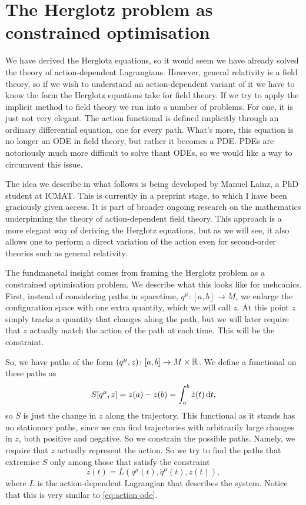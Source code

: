 \documentclass[../main.tex]{subfiles}
\begin{document}
\section{The Herglotz problem as constrained optimisation}
We have derived the Herglotz equations, so it would seem we have already solved the theory
of action-dependent Lagrangians. However, general relativity is a field theory, so if we
wish to understand an action-dependent variant of it we have to know the form the Herglotz
equations take for field theory. If we try to apply the implicit method to field theory we
run into a number of problems. For one, it is just not very elegant. The action functional
is defined implicitly through an ordinary differential equation, one for every path.
What's more, this equation is no longer an ODE in field theory, but rather it becomes a
PDE. PDEs are notoriously much more difficult to solve thant ODEs, so we would like a way
to circumvent this issue. 

The idea we describe in what follows is being developed by Manuel Lainz, a PhD student at
ICMAT. This is currently in a preprint stage, to which I have been graciously given
access.  It is part of broader ongoing research on the mathematics underpinning the theory
of action-dependent field theory. This approach is a more elegant way of deriving the
Herglotz equations, but as we will see, it also allows one to perform a direct variation
of the action even for second-order theories such as general relativity.

The fundmanetal insight comes from framing the Herglotz problem as a constrained
optimisation problem.  We describe what this looks like for mehcanics. First, instead of
considering paths in spacetime, \( q^\mu \colon [a,b] \to M \), we enlarge the
configuration space with one extra quantity, which we will call \( z \). At this point \(
z \) simply tracks a quantity that changes along the path, but we will later require that
\( z \) actually match the action of the path at each time. This will be the constraint. 

So, we have paths of the form \( (q^\mu, z) \colon [a,b] \to M \times \mathbb{R} \). We define a
functional on these paths as
\begin{equation}\label{eq:action functional unconstrained}
	S[q^\mu, z] = z(a) - z(b) = \int_a^b \dot{z}(t) \,\mathrm{d} t,
\end{equation}
so \( S \) is just the change in \( z \) along the trajectory. This functional as it
stands has no stationary paths, since we can find trajectories with arbitrarily large
changes in \( z \), both positive and negative. So we constrain the possible paths.
Namely, we require that \( z \) actually represent the action. So we try to find the paths
that extremise \( S \) only among those that satisfy the constraint
\begin{equation}\label{eq:constraint mechanics}
	\dot{z}(t) = L(q^\mu(t), \dot{q}^\mu(t), z(t)),
\end{equation}
where \( L \) is the action-dependent Lagrangian that describes the system.  Notice that
this is very similar to \cref{eq:action ode}. 
\end{document}
